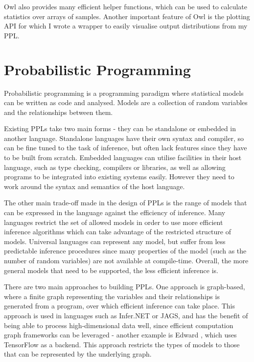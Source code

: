 \documentclass[sigconf]{acmart}
\begin{document}
Owl also provides many efficient helper functions, which can be used to calculate statistics over arrays of samples. Another important feature of Owl is the plotting API for which I wrote a wrapper to easily visualise output distributions from my PPL.


\section{Probabilistic Programming}
Probabilistic programming is a programming paradigm where statistical models can be written as code and analysed. Models are a collection of random variables and the relationships between them.

Existing PPLs take two main forms - they can be standalone or embedded in another language. Standalone languages have their own syntax and compiler, so can be fine tuned to the task of inference, but often lack features since they have to be built from scratch. Embedded languages can utilise facilities in their host language, such as type checking, compilers or libraries, as well as allowing programs to be integrated into existing systems easily. However they need to work around the syntax and semantics of the host language.

The other main trade-off made in the design of PPLs is the range of models that can be expressed in the language against the efficiency of inference. Many languages restrict the set of allowed models in order to use more efficient inference algorithms which can take advantage of the restricted structure of models. Universal languages can represent any model, but suffer from less predictable inference procedures since many properties of the model (such as the number of random variables) are not available at compile-time. Overall, the more general models that need to be supported, the less efficient inference is.

There are two main approaches to building PPLs. One approach is graph-based, where a finite graph representing the variables and their relationships is generated from a program, over which efficient inference can take place. This approach is used in languages such as Infer.NET or JAGS, and has the benefit of being able to process high-dimensional data well, since efficient computation graph frameworks can be leveraged - another example is Edward \cite{edward}, which uses TensorFlow as a backend. This approach restricts the types of models to those that can be represented by the underlying graph.
\end{document}
